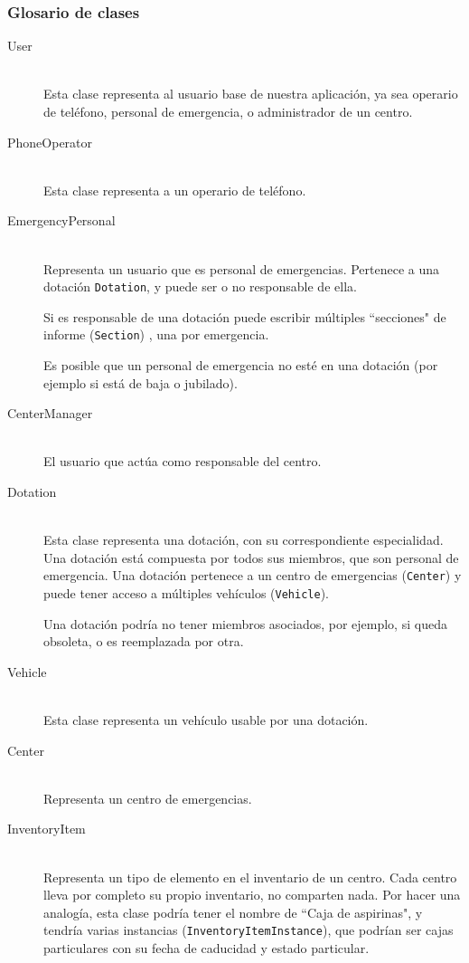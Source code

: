 \subsubsection{Glosario de clases}
\begin{description}
    \item[User] \hfill \\
        Esta clase representa al usuario base de nuestra aplicación, ya sea operario de teléfono, personal de emergencia, o administrador de un centro.
    \item[PhoneOperator] \hfill \\
        Esta clase representa a un operario de teléfono.
    \item[EmergencyPersonal] \hfill \\
        Representa un usuario que es personal de emergencias. Pertenece a una dotación \texttt{Dotation}, y puede ser o no responsable de ella. \par
        Si es responsable de una dotación puede escribir múltiples ``secciones" de informe (\texttt{Section}) , una por emergencia. \par
        Es posible que un personal de emergencia no esté en una dotación (por ejemplo si está de baja o jubilado).
    \item[CenterManager] \hfill \\
        El usuario que actúa como responsable del centro.
    \item[Dotation] \hfill \\
        Esta clase representa una dotación, con su correspondiente especialidad. Una dotación está compuesta por todos sus miembros, que son personal de emergencia. Una dotación pertenece a un centro de emergencias (\texttt{Center}) y puede tener acceso a múltiples vehículos (\texttt{Vehicle}). \par
        Una dotación podría no tener miembros asociados, por ejemplo, si queda obsoleta, o es reemplazada por otra.
    \item[Vehicle] \hfill \\
        Esta clase representa un vehículo usable por una dotación.
    \item[Center] \hfill \\
        Representa un centro de emergencias.
    \item[InventoryItem] \hfill \\
        Representa un tipo de elemento en el inventario de un centro. Cada centro lleva por completo su propio inventario, no comparten nada. Por hacer una analogía, esta clase podría tener el nombre de ``Caja de aspirinas", y tendría varias instancias (\texttt{InventoryItemInstance}), que podrían ser cajas particulares con su fecha de caducidad y estado particular. \par

\end{description}
